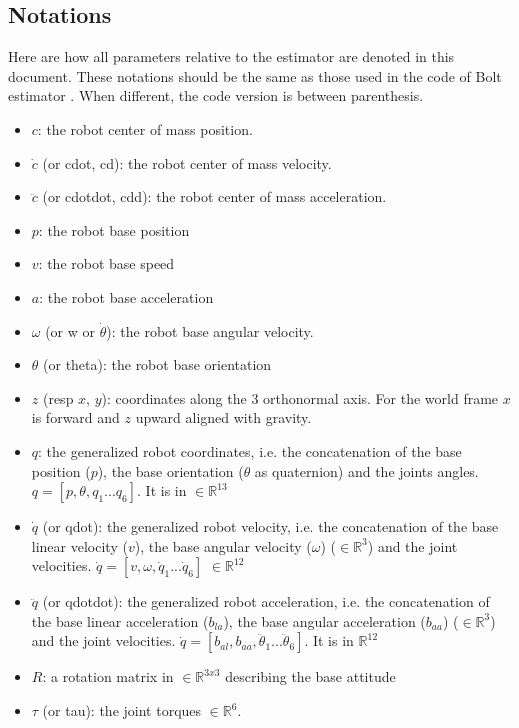 \documentclass[a4paper,10pt]{article}
\begin{document}
\subsection{Notations}
Here are how all parameters relative to the estimator are denoted in this document. These notations should be the same as those used in the code of Bolt estimator \cite{Git_NAlbrecht}. When different, the code version is between parenthesis.
\begin{itemize}[noitemsep,topsep=0.5pt,parsep=0.1pt,partopsep=0.1pt]
	\item $c$: the robot center of mass position.
	\item $\dot c$ (or cdot, cd): the robot center of mass velocity.
	\item $\ddot c$ (or cdotdot, cdd): the robot center of mass acceleration.
	\item $p$: the robot base position
	\item $v$: the robot base speed
	\item $a$: the robot base acceleration
	\item $\omega$ (or w or $\dot \theta$): the robot base angular velocity.
	\item $\theta$ (or theta): the robot base orientation
	\item $z$ (resp $x$, $y$): coordinates along the 3 orthonormal axis. For the world frame $x$ is forward and $z$ upward aligned with gravity.
	\item $q$: the generalized robot coordinates, i.e. the concatenation of the base position ($p$), the base orientation ($\theta$ as quaternion) and the joints angles. $q = [p, \theta, q_1 ... q_6]$. It is in $\in\mathbb{R}^{13}$
	\item $\dot q$ (or qdot): the generalized robot velocity, i.e. the concatenation of the base linear velocity ($v$), the base angular velocity ($\omega$) ($\in\mathbb{R}^3$) and the joint velocities. $\dot{q} = [v, \omega, \dot{q}_1 ... \dot{q}_6]$ $\in\mathbb{R}^{12}$
	\item $\ddot q$ (or qdotdot): the generalized robot acceleration, i.e. the concatenation of the base linear acceleration ($b_{la}$), the base angular acceleration ($b_{aa}$) ($\in\mathbb{R}^3$) and the joint velocities. $\dot{q} = [b_{al}, b_{aa}, \ddot{\theta}_1 ... \ddot{\theta}_6]$. It is in $\mathbb{R}^{12}$
	\item $R$: a rotation matrix in $\in\mathbb{R}^{3x3}$ describing the base attitude
	\item $\tau$ (or tau): the joint torques $\in\mathbb{R}^6$.
\end{itemize}
\end{document}

